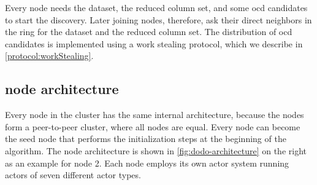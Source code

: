   Every node needs the dataset, the reduced column set, and some \gls{ocd} candidates to start the discovery.
  Later joining nodes, therefore, ask their direct neighbors in the ring for the dataset and the reduced column set.
  The distribution of \gls{ocd} candidates is implemented using a work stealing protocol, which we describe in \cref{protocol:workStealing}.

\subsection{\dodo{} node architecture}\label{sec:node-architecture}
  Every node in the cluster has the same internal architecture, because the nodes form a peer-to-peer cluster, where all nodes are equal.
  Every node can become the seed node that performs the initialization steps at the beginning of the algorithm.
  The node architecture is shown in \cref{fig:dodo-architecture} on the right as an example for node 2.
  Each node employs its own actor system running actors of seven different actor types.


